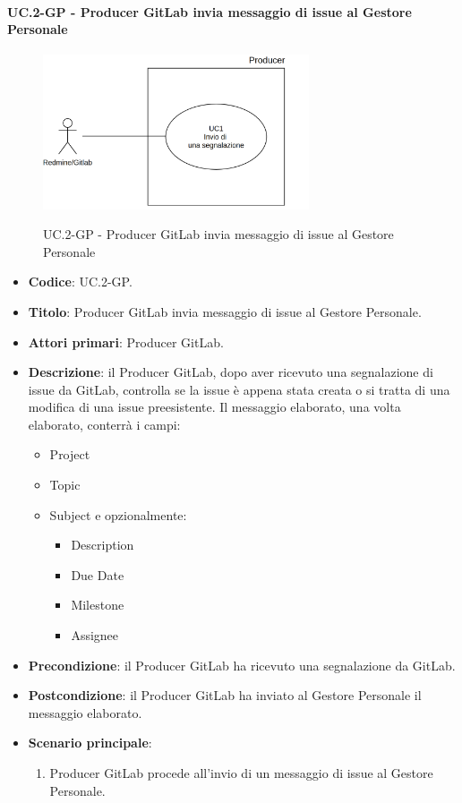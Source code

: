 	\paragraph{UC\theuccount.2-GP -  Producer GitLab invia messaggio di issue al Gestore Personale}
	\begin{figure}[H]
		\centering
		\includegraphics[width=0.7\textwidth]{img/UC1.png}\\
		\caption{UC\theuccount.2-GP -  Producer GitLab invia messaggio di issue al Gestore Personale}
	\end{figure}
	\begin{itemize}
		\item \textbf{Codice}: UC\theuccount.2-GP.
		\item \textbf{Titolo}:  Producer GitLab invia messaggio di issue al Gestore Personale.
		\item \textbf{Attori primari}: Producer GitLab.
		\item \textbf{Descrizione}: il Producer GitLab, dopo aver ricevuto una segnalazione di issue da GitLab, controlla se la issue è appena stata creata o si tratta di una modifica di
		una issue preesistente. Il messaggio elaborato, una volta elaborato, conterrà i campi:
		\begin{itemize}
			\item Project
			\item Topic
			\item Subject e opzionalmente:
			\begin{itemize}
				\item Description
				\item Due Date
				\item Milestone
				\item Assignee
			\end{itemize}
		\end{itemize}
		\item \textbf{Precondizione}: il Producer GitLab ha ricevuto una segnalazione da GitLab.
		\item \textbf{Postcondizione}: il Producer GitLab ha inviato al Gestore Personale il messaggio \newline elaborato.
		\item \textbf{Scenario principale}: 
		\begin{enumerate}
			\item Producer GitLab procede all'invio di un messaggio di
			issue al Gestore Personale.
		\end{enumerate}
		
	\end{itemize}
	
